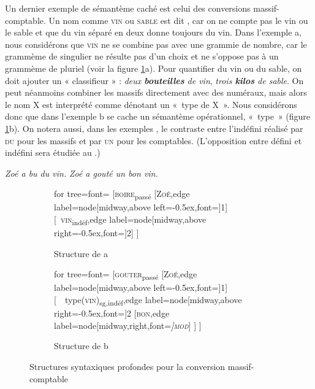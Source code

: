 Un dernier exemple de sémantème caché est celui des conversions massif-comptable. Un nom comme \textsc{vin} ou \textsc{sable} est dit , car on ne compte pas le vin ou le sable et que du vin séparé en deux donne toujours du vin. Dans l’exemple a, nous considérons que \textsc{vin} ne se combine pas avec une grammie de nombre, car le grammème de singulier ne résulte pas d’un choix et ne s’oppose pas à un grammème de pluriel (voir la figure \ref{fig:13-vin}a). Pour quantifier du vin ou du sable, on doit ajouter un « classifieur » : \textit{deux \textbf{bouteilles} de vin}, \textit{trois \textbf{kilos} de sable}. On peut néanmoins combiner les massifs directement avec des numéraux, mais alors le nom X est interprété comme dénotant un «~type de X~». Nous considérons donc que dans l’exemple b se cache un sémantème opérationnel, «~type~» (figure \ref{fig:13-vin}b). On notera aussi, dans les exemples , le contraste entre l’indéfini réalisé par \textsc{du} pour les massifs et par \textsc{un} pour les comptables. (L'opposition entre défini et indéfini sera étudiée au .)

\ea\label{ex:13-vin}
\ea \textit{Zoé a bu du vin.}
\ex \textit{Zoé a gouté un bon vin.}\z\z

\begin{figure}
	\begin{subfigure}[b]{0.5\textwidth}
		\centering
		\begin{forest} for tree={font=\normalfont}
			[\textsc{boire}\textsubscript{passé}
				[\textsc{Zoé},edge label={node[midway,above left=-0.5ex,font=\footnotesize]{1}}]
				[\ \textsc{vin}\textsubscript{indéf},edge label={node[midway,above right=-0.5ex,font=\footnotesize]{2}}]
			]
		\end{forest}
		\caption{Structure de a}
	\end{subfigure}%
	\hfill
	\begin{subfigure}[b]{0.5\textwidth}
		\centering
		\begin{forest} for tree={font=\normalfont}
			[\textsc{gouter}\textsubscript{passé}
				[\textsc{Zoé},edge label={node[midway,above left=-0.5ex,font=\footnotesize]{1}}]
				[\ \ type(\textsc{vin})\textsubscript{sg,indéf},edge label={node[midway,above right=-0.5ex,font=\footnotesize]{2}}
					[\textsc{bon},edge label={node[midway,right,font=\footnotesize\itshape]{\textsc{mod}}}]
				]
			]
		\end{forest}
		\caption{Structure de b}
	\end{subfigure}
\caption{Structures syntaxiques profondes pour la conversion massif-comptable\label{fig:13-vin}}
\end{figure}

